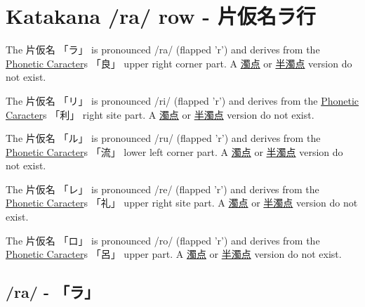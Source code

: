 \section{Katakana /ra/ row - 片仮名ラ行}\label{sec:KatakanaRaRow}


 The  片仮名 {「ラ」} is pronounced  /ra/ (flapped 'r')  and  derives from the
\hyperref[sec:PhoneticCharacter]{Phonetic Caracter}s {「良」} upper right corner part.
A \hyperref[sec:Dakuten]{濁点}  or \hyperref[sec:Handakuten]{半濁点} version  do not exist.


 The  片仮名 {「リ」} is pronounced  /ri/ (flapped 'r')  and  derives from the
\hyperref[sec:PhoneticCharacter]{Phonetic Caracter}s {「利」}  right site part.
A \hyperref[sec:Dakuten]{濁点}  or \hyperref[sec:Handakuten]{半濁点} version  do not exist.


\newpage

 The  片仮名 {「ル」} is pronounced  /ru/ (flapped 'r')  and  derives from the
\hyperref[sec:PhoneticCharacter]{Phonetic Caracter}s {「流」} lower left corner part.
A \hyperref[sec:Dakuten]{濁点}  or \hyperref[sec:Handakuten]{半濁点} version  do not exist.


 The  片仮名 {「レ」} is pronounced  /re/ (flapped 'r')  and  derives from the
\hyperref[sec:PhoneticCharacter]{Phonetic Caracter}s {「礼」} upper right site part.
A \hyperref[sec:Dakuten]{濁点}  or \hyperref[sec:Handakuten]{半濁点} version  do not exist.

 The  片仮名 {「ロ」} is pronounced  /ro/ (flapped 'r')  and  derives from the
\hyperref[sec:PhoneticCharacter]{Phonetic Caracter}s {「呂」} upper part.
A \hyperref[sec:Dakuten]{濁点}  or \hyperref[sec:Handakuten]{半濁点} version  do not exist.


\newpage

\subsection{/ra/ - 「ラ」} \label{sec:KatakanaRa}

 

